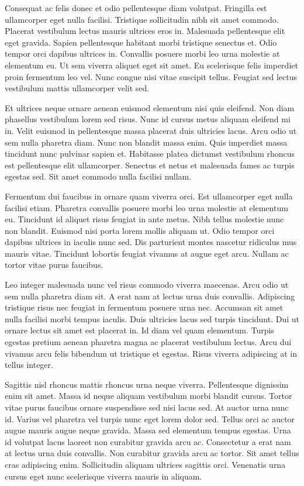 \documentclass[11pt,a4paper]{article}
\begin{document}
Consequat ac felis donec et odio pellentesque diam volutpat. Fringilla est ullamcorper eget nulla facilisi. Tristique sollicitudin nibh sit amet commodo. Placerat vestibulum lectus mauris ultrices eros in. Malesuada pellentesque elit eget gravida. Sapien pellentesque habitant morbi tristique senectus et. Odio tempor orci dapibus ultrices in. Convallis posuere morbi leo urna molestie at elementum eu. Ut sem viverra aliquet eget sit amet. Eu scelerisque felis imperdiet proin fermentum leo vel. Nunc congue nisi vitae suscipit tellus. Feugiat sed lectus vestibulum mattis ullamcorper velit sed.

Et ultrices neque ornare aenean euismod elementum nisi quis eleifend. Non diam phasellus vestibulum lorem sed risus. Nunc id cursus metus aliquam eleifend mi in. Velit euismod in pellentesque massa placerat duis ultricies lacus. Arcu odio ut sem nulla pharetra diam. Nunc non blandit massa enim. Quis imperdiet massa tincidunt nunc pulvinar sapien et. Habitasse platea dictumst vestibulum rhoncus est pellentesque elit ullamcorper. Senectus et netus et malesuada fames ac turpis egestas sed. Sit amet commodo nulla facilisi nullam.

Fermentum dui faucibus in ornare quam viverra orci. Est ullamcorper eget nulla facilisi etiam. Pharetra convallis posuere morbi leo urna molestie at elementum eu. Tincidunt id aliquet risus feugiat in ante metus. Nibh tellus molestie nunc non blandit. Euismod nisi porta lorem mollis aliquam ut. Odio tempor orci dapibus ultrices in iaculis nunc sed. Dis parturient montes nascetur ridiculus mus mauris vitae. Tincidunt lobortis feugiat vivamus at augue eget arcu. Nullam ac tortor vitae purus faucibus.

Leo integer malesuada nunc vel risus commodo viverra maecenas. Arcu odio ut sem nulla pharetra diam sit. A erat nam at lectus urna duis convallis. Adipiscing tristique risus nec feugiat in fermentum posuere urna nec. Accumsan sit amet nulla facilisi morbi tempus iaculis. Duis ultricies lacus sed turpis tincidunt. Dui ut ornare lectus sit amet est placerat in. Id diam vel quam elementum. Turpis egestas pretium aenean pharetra magna ac placerat vestibulum lectus. Arcu dui vivamus arcu felis bibendum ut tristique et egestas. Risus viverra adipiscing at in tellus integer.

Sagittis nisl rhoncus mattis rhoncus urna neque viverra. Pellentesque dignissim enim sit amet. Massa id neque aliquam vestibulum morbi blandit cursus. Tortor vitae purus faucibus ornare suspendisse sed nisi lacus sed. At auctor urna nunc id. Varius vel pharetra vel turpis nunc eget lorem dolor sed. Tellus orci ac auctor augue mauris augue neque gravida. Massa sed elementum tempus egestas. Urna id volutpat lacus laoreet non curabitur gravida arcu ac. Consectetur a erat nam at lectus urna duis convallis. Non curabitur gravida arcu ac tortor. Sit amet tellus cras adipiscing enim. Sollicitudin aliquam ultrices sagittis orci. Venenatis urna cursus eget nunc scelerisque viverra mauris in aliquam.
\end{document}

